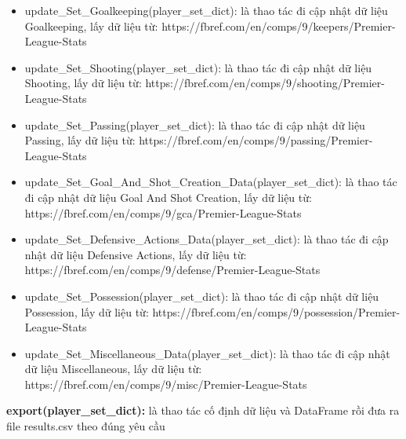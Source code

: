 \documentclass[12pt]{report}
\begin{document}
{\begin{itemize}
	\item update\_Set\_Goalkeeping(player\_set\_dict): là thao tác đi cập nhật dữ liệu Goalkeeping, lấy dữ liệu từ: https://fbref.com/en/comps/9/keepers/Premier-League-Stats
	\item update\_Set\_Shooting(player\_set\_dict): là thao tác đi cập nhật dữ liệu Shooting, lấy dữ liệu từ: https://fbref.com/en/comps/9/shooting/Premier-League-Stats
	\item update\_Set\_Passing(player\_set\_dict): là thao tác đi cập nhật dữ liệu Passing, lấy dữ liệu từ: https://fbref.com/en/comps/9/passing/Premier-League-Stats
	\item update\_Set\_Goal\_And\_Shot\_Creation\_Data(player\_set\_dict): là thao tác đi cập nhật dữ liệu Goal And Shot Creation, lấy dữ liệu từ: https://fbref.com/en/comps/9/gca/Premier-League-Stats
	\item update\_Set\_Defensive\_Actions\_Data(player\_set\_dict): là thao tác đi cập nhật dữ liệu Defensive Actions, lấy dữ liệu từ: https://fbref.com/en/comps/9/defense/Premier-League-Stats
	\item update\_Set\_Possession(player\_set\_dict): là thao tác đi cập nhật dữ liệu Possession, lấy dữ liệu từ: https://fbref.com/en/comps/9/possession/Premier-League-Stats
	\item update\_Set\_Miscellaneous\_Data(player\_set\_dict): là thao tác đi cập nhật dữ liệu Miscellaneous, lấy dữ liệu từ: https://fbref.com/en/comps/9/misc/Premier-League-Stats
\end{itemize}
\textbf{export(player\_set\_dict):} là thao tác cố định dữ liệu và DataFrame rồi đưa ra file results.csv theo đúng yêu cầu
}
\end{document}
